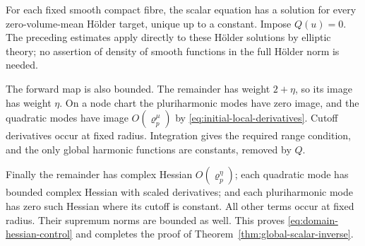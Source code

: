 For each fixed smooth compact fibre, the scalar
equation has a solution for every zero-volume-mean
Hölder target, unique up to a constant. Impose
$Q(u)=0$. The preceding estimates apply directly
to these Hölder solutions by elliptic theory;
no assertion of density of smooth functions in
the full Hölder norm is needed.

The forward map is also bounded. The remainder
has weight $2+\eta$, so its image has weight
$\eta$. On a node chart the pluriharmonic modes
have zero image, and the quadratic modes have
image $O(\varrho_p^\mu)$ by
\eqref{eq:initial-local-derivatives}. Cutoff
derivatives occur at fixed radius. Integration
gives the required range condition, and the
only global harmonic functions are constants,
removed by $Q$.

Finally the remainder has complex Hessian
$O(\varrho_p^\eta)$; each quadratic mode has
bounded complex Hessian with scaled derivatives;
and each pluriharmonic mode has zero such
Hessian where its cutoff is constant. All other
terms occur at fixed radius. Their supremum
norms are bounded as well. This proves
\eqref{eq:domain-hessian-control} and completes
the proof of Theorem~\ref{thm:global-scalar-inverse}.

